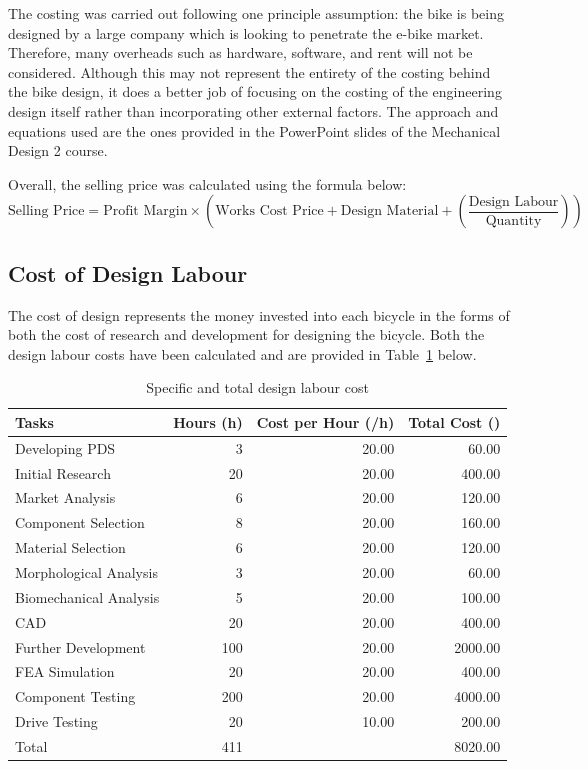 \documentclass[a4paper,11pt]{article}
\begin{document}
The costing was carried out following one principle assumption: the bike is being designed by a large company which is looking to penetrate the e-bike market. Therefore, many overheads such as hardware, software, and rent will not be considered. Although this may not represent the entirety of the costing behind the bike design, it does a better job of focusing on the costing of the engineering design itself rather than incorporating other external factors. The approach and equations used are the ones provided in the PowerPoint slides of the Mechanical Design 2 course.

Overall, the selling price was calculated using the formula below: 
\[
	\text{Selling Price} = \text{Profit Margin} \times \left(\text{Works Cost Price} + \text{Design Material} + \left(\frac{\text{Design Labour}}{\text{Quantity}}\right)\right)
\]

\subsection{Cost of Design Labour}

The cost of design represents the money invested into each bicycle in the forms of both the cost of research and development for designing the bicycle. Both the design labour costs have been calculated and are provided in Table~\ref{tab:labco} below.  

\begin{table}[!ht]
	\centering
	\caption{Specific and total design labour cost}
	\begin{tabular}{l r r r}
		\hline
		\multicolumn{1}{l}{Tasks}&\multicolumn{1}{l}{Hours (h)}&\multicolumn{1}{l}{Cost per Hour (\textsterling/h)}&\multicolumn{1}{l}{Total Cost (\textsterling)}\\\hline
		Developing PDS	&3&20.00&60.00\\
		Initial Research&20&20.00&400.00\\
		Market Analysis&6&20.00&120.00\\
		Component Selection&8&20.00&160.00\\
		Material Selection&6&20.00&120.00\\
		Morphological Analysis&3&20.00&60.00\\
		Biomechanical Analysis&5&20.00&100.00\\
		CAD&20&20.00&400.00\\
		Further Development&100&20.00&2000.00\\
		FEA Simulation&20&20.00&400.00\\
		Component Testing&200&20.00&4000.00\\
		Drive Testing&20&10.00&200.00\\\hline
		Total&411&&8020.00\\\hline
	\end{tabular}
	\label{tab:labco}
\end{table}
\end{document}
